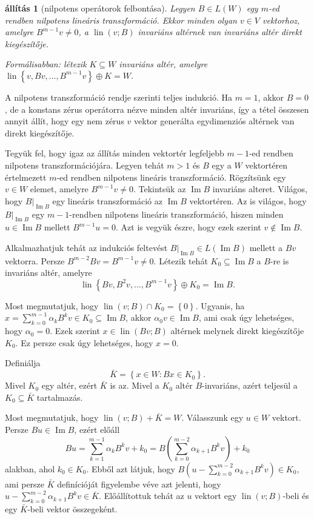 \documentclass[a4paper, showtrims]{memoir}
\makeatletter
\renewenvironment{proof}[1][\proofname]
    {\par\pushQED{\qed}%
    \normalfont \topsep6\p@\@plus6\p@\relax
    \trivlist
    \item[\hskip\labelsep
        \itshape
    #1\@addpunct{:}]\ignorespaces}
    {\popQED\endtrivlist\@endpefalse}
\theoremstyle{plain}
\newtheorem{proposition}{állítás}[chapter]
\theoremstyle{remark}
\theoremstyle{definition}
\DeclareMathOperator{\lin}{lin}
\DeclareMathOperator{\im}{Im}
\makeatother
\begin{document}
\begin{proposition}[nilpotens operátorok felbontása]
	Legyen $B\in L\left( W \right)$ egy $m$-ed rendben nilpotens lineáris transzformáció.
	Ekkor minden olyan $v\in V$ vektorhoz,
	amelyre $B^{m-1}v\neq 0$, a $\lin(v;B)$ invariáns altérnek van invariáns altér
	direkt kiegészítője.

	Formálisabban: létezik $K\subseteq W$ invariáns altér, amelyre
	\(
	\lin\left\{ v,Bv,\ldots,B^{m-1}v \right\}\oplus K = W.
	\)
	\label{pr:nilpfelb}
\end{proposition}
\begin{proof}
	A nilpotens transzformáció rendje szerinti teljes indukció.
	Ha $m=1$, akkor $B=0$, de a konstans zérus operátorra nézve minden altér invariáns,
	így a tétel összesen annyit állít, hogy egy nem zérus $v$ vektor generálta egydimenziós altérnek van direkt kiegészítője.

	Tegyük fel, hogy igaz az állítás minden vektortér legfeljebb $m-1$-ed rendben nilpotens transzformációjára.
	Legyen tehát $m>1$ és $B$ egy a $W$ vektortéren értelmezett $m$-ed rendben nilpotens lineáris transzformáció.
	Rögzítsünk egy $v\in W$ elemet, amelyre $B^{m-1}v\neq 0$.
	Tekintsük az $\im B$ invariáns alteret.
	Világos, hogy $B|_{\im B}$ egy lineáris transzformáció az $\im B$ vektortéren.
	Az is világos, hogy $B|_{\im B}$ egy $m-1$-rendben nilpotens lineáris transzformáció, hiszen
	minden $u\in\im B$ mellett $B^{m-1}u=0$.
	Azt is vegyük észre, hogy ezek szerint $v\notin\im B$.

	Alkalmazhatjuk tehát az indukciós feltevést $B|_{\im B}\in L\left( \im B \right)$ mellett a
	$Bv$ vektorra.
	Persze $B^{m-2}Bv=B^{m-1}v\neq 0$.
	Létezik tehát $K_0\subseteq\im B$ a $B$-re is invariáns altér, amelyre
	\[
		\lin\left\{ Bv,B^2v,\ldots,B^{m-1}v \right\}\oplus K_0 = \im B.
	\]

	Most megmutatjuk, hogy $\lin(v;B)\cap K_0=\left\{ 0 \right\}.$
	Ugyanis, ha
	$
		x=\sum_{k=0}^{m-1}\alpha_kB^kv\in K_0\subseteq\im B
	$, akkor $\alpha_0v\in\im B$,
	ami csak úgy lehetséges, hogy $\alpha_0=0$.
	Ezek szerint $x\in\lin(Bv;B)$ altérnek melynek direkt kiegészítője $K_0$.
	Ez persze csak úgy lehetséges, hogy $x=0$.

	Definiálja
	\[
		\bar{K}=\left\{ x\in W:Bx\in K_0 \right\}.
	\]
	Mivel $K_0$ egy altér, ezért $\bar{K}$ is az.
	Mivel a $K_0$ altér $B$-invariáns, azért teljesül a $K_0\subseteq \bar{K}$ tartalmazás.

	Most megmutatjuk, hogy $\lin(v;B)+\bar{K}=W$.
	Válasszunk egy $u\in W$ vektort.
	Persze $Bu\in\im B$, ezért előáll
	\[
		Bu
		=
		\sum_{k=1}^{m-1}\alpha_kB^kv +k_0
		=
		B\left(
		\sum_{k=0}^{m-2}\alpha_{k+1}B^kv
		\right)
		+ k_0
	\]
	alakban, ahol $k_0\in K_0$.
	Ebből azt látjuk, hogy
	$
		B
		\left(
		u-
		\sum_{k=0}^{m-2}\alpha_{k+1}B^kv
		\right)
		\in
		K_0,
	$
	ami persze $\bar{K}$ definícióját figyelembe véve azt jelenti, hogy
	\(
	u-
	\sum_{k=0}^{m-2}\alpha_{k+1}B^kv
	\in
	\bar{K}.
	\)
	Előállítottuk tehát az $u$ vektort egy $\lin(v;B)$-beli és egy
	$\bar{K}$-beli vektor összegeként.


\end{proof}
\end{document}
